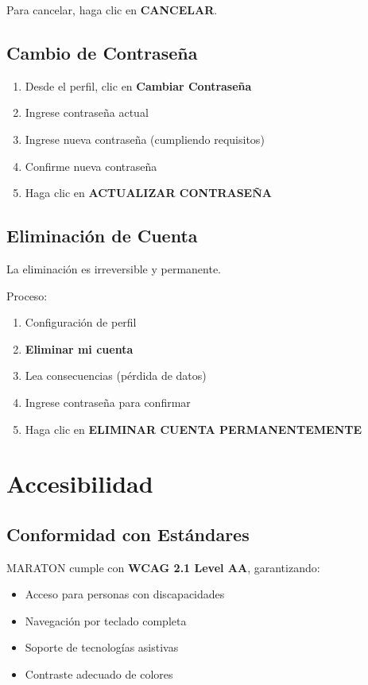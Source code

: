 \documentclass[11pt,a4paper,twoside]{book}
\begin{document}
Para cancelar, haga clic en \textbf{CANCELAR}.

\section{Cambio de Contraseña}

\begin{enumerate}
    \item Desde el perfil, clic en \textbf{Cambiar Contraseña}
    \item Ingrese contraseña actual
    \item Ingrese nueva contraseña (cumpliendo requisitos)
    \item Confirme nueva contraseña
    \item Haga clic en \textbf{ACTUALIZAR CONTRASEÑA}
\end{enumerate}

\section{Eliminación de Cuenta}

\begin{warningbox}
La eliminación es irreversible y permanente.
\end{warningbox}

Proceso:
\begin{enumerate}
    \item Configuración de perfil
    \item \textbf{Eliminar mi cuenta}
    \item Lea consecuencias (pérdida de datos)
    \item Ingrese contraseña para confirmar
    \item Haga clic en \textbf{ELIMINAR CUENTA PERMANENTEMENTE}
\end{enumerate}

\chapter{Accesibilidad}

\section{Conformidad con Estándares}

MARATON cumple con \textbf{WCAG 2.1 Level AA}, garantizando:
\begin{itemize}
    \item Acceso para personas con discapacidades
    \item Navegación por teclado completa
    \item Soporte de tecnologías asistivas
    \item Contraste adecuado de colores
\end{itemize}
\end{document}
